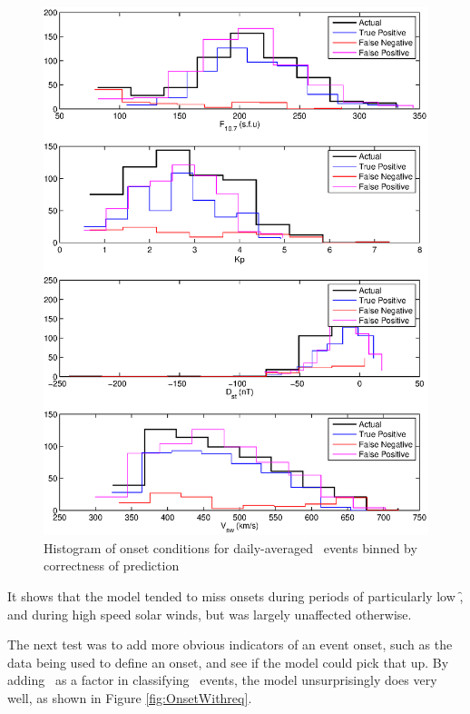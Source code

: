 \begin{figure}[htp!]
	\centering
	\includegraphics[width=0.85\linewidth]{Figures/CH5/NNBinaryOnset-daily-hist.eps}
	\caption{Histogram of onset conditions for daily-averaged \req\ events binned by correctness of prediction}
	\label{fig:OnsetEventsHist}
\end{figure}

It shows that the model tended to miss onsets during periods of particularly low \f, and during high speed solar winds, but was largely unaffected otherwise.

The next test was to add more obvious indicators of an event onset, such as the data being used to define an onset, and see if the model could pick that up. By adding \req\ as a factor in classifying \req\ events, the model unsurprisingly does very well, as shown in Figure \ref{fig:OnsetWithreq}.

